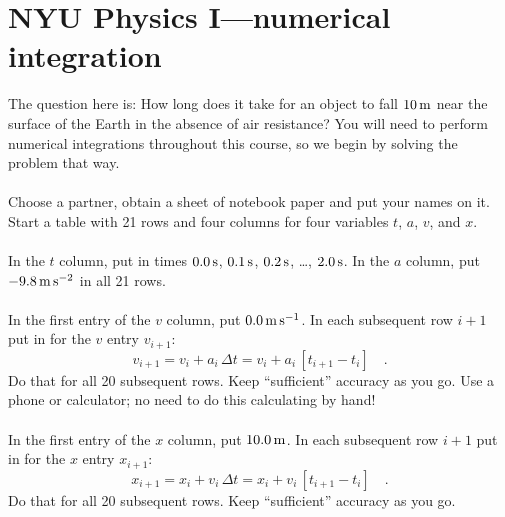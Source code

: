 \documentclass[12pt]{article}
\begin{document}
\section*{NYU Physics I---numerical integration}

The question here is: How long does it take for an object to fall
$10\,\mathrm{m}$ near the surface of the Earth in the absence of air
resistance?  You will need to perform numerical integrations
throughout this course, so we begin by solving the problem that way.

\paragraph{\theproblem}%
Choose a partner, obtain a sheet of notebook paper and
put your names on it.  Start a table with 21 rows and four columns for
four variables $t$, $a$, $v$, and $x$.

\paragraph{\theproblem}%
In the $t$ column, put in times $0.0\,\mathrm{s}$, $0.1\,\mathrm{s}$, $0.2\,\mathrm{s}$,
\ldots, $2.0\,\mathrm{s}$.  In the $a$ column, put $-9.8\,\mathrm{m}\,\mathrm{s}^{-2}$ in all 21
rows.

\paragraph{\theproblem}%
In the first entry of the $v$ column, put $0.0\,\mathrm{m}\,\mathrm{s}^{-1}$.  In each
subsequent row $i+1$ put in for the $v$ entry $v_{i+1}$:
\begin{equation}
v_{i+1}= v_i + a_i\,\Delta t = v_i + a_i\,\left[t_{i+1}-t_i\right] \quad .
\end{equation}
Do that for all 20 subsequent rows.  Keep ``sufficient'' accuracy as
you go. Use a phone or calculator; no need to do this calculating by hand!

\paragraph{\theproblem}%
In the first entry of the $x$ column, put $10.0\,\mathrm{m}$.  In each
subsequent row $i+1$ put in for the $x$ entry $x_{i+1}$:
\begin{equation}
x_{i+1}= x_i + v_i\,\Delta t = x_i + v_i\,\left[t_{i+1}-t_i\right] \quad .
\end{equation}
Do that for all 20 subsequent rows.  Keep ``sufficient'' accuracy as
you go.
\end{document}
